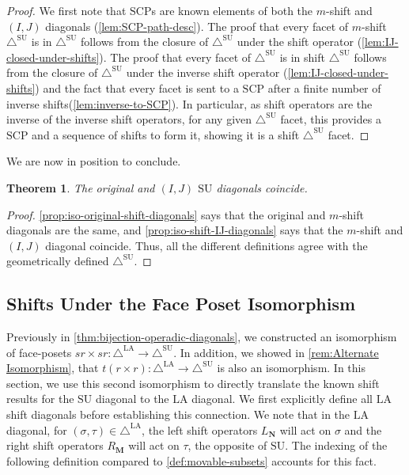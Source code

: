 \documentclass{amsart}
\newtheorem{theorem}{Theorem}[section]
\theoremstyle{definition}
\newcommand{\SU}{\mathrm{SU}}
\newcommand{\LA}{\mathrm{LA}}
\newcommand{\SUD}{\triangle^{\mathrm{SU}}}
\newcommand{\LAD}{\triangle^{\mathrm{LA}}}
\newcommand{\SCP}{\mathrm{SCP}}
\begin{document}
\begin{proof}

    We first note that $\SCP$s are known elements of both the $m$-shift and $(I,J)$ diagonals (\cref{lem:SCP-path-desc}).
    The proof that every facet of $m$-shift $\SUD$ is in $\SUD$ follows from the closure of $\SUD$ under the shift operator (\cref{lem:IJ-closed-under-shifts}).
    The proof that every facet of $\SUD$ is in shift $\SUD$ follows from the closure of $\SUD$ under the inverse shift operator (\cref{lem:IJ-closed-under-shifts}) and the fact that every facet is sent to a $\SCP$ after a finite number of inverse shifts(\cref{lem:inverse-to-SCP}).
    In particular, as shift operators are the inverse of the inverse shift operators, for any given $\SUD$ facet, this provides a $\SCP$ and a sequence of shifts to form it, showing it is a shift $\SUD$ facet.
\end{proof}

We are now in position to conclude.

\begin{theorem}
    \label{thm:recover-SU}
    The original and $(I,J)$ $\SU$ diagonals coincide.
\end{theorem}

\begin{proof}
    \cref{prop:iso-original-shift-diagonals} says that the original and $m$-shift diagonals are the same, and \cref{prop:iso-shift-IJ-diagonals} says that the $m$-shift and $(I,J)$ diagonal coincide.
    Thus, all the different definitions agree with the geometrically defined $\SUD$. 
\end{proof}





\subsection{Shifts Under the Face Poset Isomorphism}

Previously in \cref{thm:bijection-operadic-diagonals}, we constructed an isomorphism of face-posets $sr\times sr:\LAD\to\SUD$.
In addition, we showed in \cref{rem:Alternate Isomorphism}, that $t(r\times r):\LAD\to\SUD$ is also an isomorphism.
In this section, we use this second isomorphism to directly translate the known shift results for the $\SU$ diagonal to the $\LA$ diagonal. 
We first explicitly define all $\LA$ shift diagonals before establishing this connection.
We note that in the $\LA$ diagonal, for $(\sigma,\tau)\in \LAD$, the left shift operators $L_\mathbf{N}$ will act on $\sigma$ and the right shift operators $R_\mathbf{M}$ will act on $\tau$, the opposite of $\SU$.
The indexing of the following definition compared to \cref{def:movable-subsets} accounts for this fact.
\end{document}
